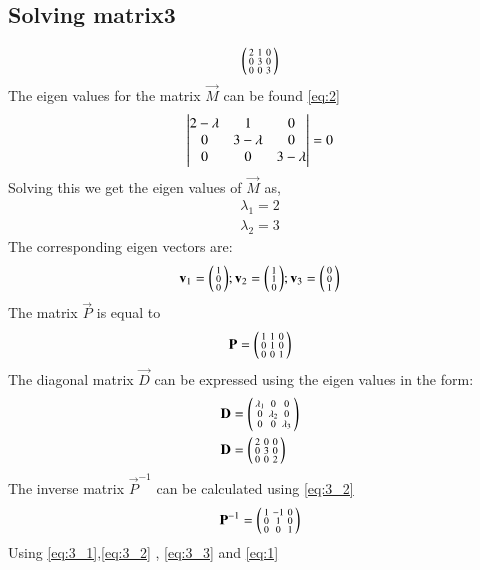 \documentclass[journal,12pt,twocolumn]{IEEEtran}
\begin{document}
\subsection{Solving matrix3 }
\begin{align}
	\begin{psmallmatrix}2&1&0\\0&3&0\\0 & 0&3\end{psmallmatrix}\label{problem:3}
\end{align}
The eigen values for the matrix $\vec{M}$ can be found \eqref{eq:2}
\begin{align}
	\begin{vmatrix}2- \lambda & 1 & 0\\ 0 & 3 -\lambda&0\\0& 0& 3-\lambda\end{vmatrix}=0
\end{align}
Solving this we get the eigen values of $\vec{M}$ as, 
\begin{align}
	\lambda_1 = 2\\
	\lambda_2=  3
\end{align}
The corresponding eigen vectors are:
\begin{align}
	\mathbf v_1 = \begin{psmallmatrix}1\\ 0\\0\end{psmallmatrix};
	\mathbf v_2 = \begin{psmallmatrix}1\\ 1\\0\end{psmallmatrix};
	\mathbf v_3 = \begin{psmallmatrix}0\\ 0\\1\end{psmallmatrix}
\end{align}
The matrix $\vec{P}$ is equal to
\begin{align}
	\mathbf{P}=\begin{psmallmatrix}1&1&0\\0&1&0\\0&0&1\end{psmallmatrix}\label{eq:3_1}
\end{align}
The diagonal matrix $\vec{D}$ can be expressed using the eigen values in the form:
\begin{align}
	\mathbf{D}&=\begin{psmallmatrix}\lambda_1&0&0\\0&\lambda_2&0\\0&0&\lambda_3\end{psmallmatrix}\\
	\mathbf{D} &=\begin{psmallmatrix}2&0&0\\0&3&0\\0&0&2\end{psmallmatrix}\label{eq:3_2}
\end{align}
The inverse matrix $\vec{P}^{-1}$ can be calculated using \eqref{eq:3_2}
\begin{align}
	\mathbf{P}^{-1}=\begin{psmallmatrix}1&-1&0\\0&1&0\\0&0&1\end{psmallmatrix}\label{eq:3_3}
\end{align}
Using \eqref{eq:3_1},\eqref{eq:3_2} , \eqref{eq:3_3} and \eqref{eq:1}
\end{document}
